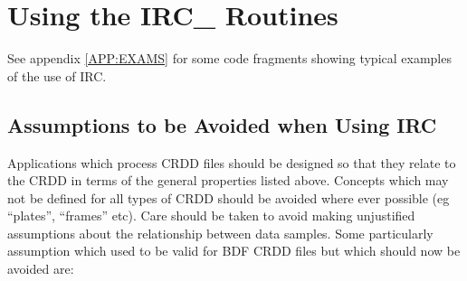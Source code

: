 
\section {Using the IRC\_ Routines}
See appendix \ref {APP:EXAMS} for some code fragments showing typical examples
of the use of IRC.

\subsection {Assumptions to be Avoided when Using IRC}
Applications which process CRDD files should be designed so that they relate to
the CRDD in terms of the general properties listed above. Concepts which may not
be defined for all types of CRDD should be avoided where ever possible (eg
``plates'', ``frames'' etc). Care should be taken to avoid making unjustified
assumptions about the relationship between data samples. Some particularly
assumption which used to be valid for BDF CRDD files but which should now be
avoided are:

